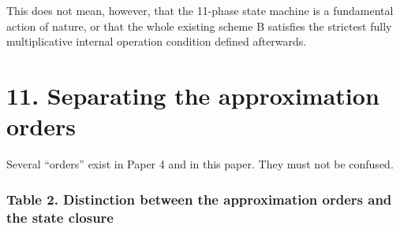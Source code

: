 \documentclass[
  a4paper,
]{article}
\begin{document}
\begin{center}
\end{center}

This does not mean, however, that the 11-phase state machine is a
fundamental action of nature, or that the whole existing scheme B
satisfies the strictest fully multiplicative internal operation
condition defined afterwards.

\section{11. Separating the approximation
orders}\label{separating-the-approximation-orders}

Several ``orders'' exist in Paper 4 and in this paper. They must not be
confused.

\subsubsection{Table 2. Distinction between the approximation orders and
the state
closure}\label{table-2.-distinction-between-the-approximation-orders-and-the-state-closure}
\end{document}
